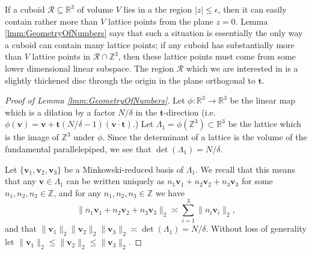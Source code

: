 \documentclass[10pt]{amsart}
\theoremstyle{plain}
\numberwithin{sblmm}{thrm}
\numberwithin{equation}{section}
\begin{document}
%
%
%
%
If a cuboid $\mathcal{R}\subseteq\mathbb{R}^3$ of volume $V$ lies in a the region $|z|\le \epsilon$, then it can easily contain rather more than $V$ lattice points from the plane $z=0$. Lemma \ref{lmm:GeometryOfNumbers} says that such a situation is essentially the only way a cuboid can contain many lattice points; if any cuboid has substantially more than $V$ lattice points in $\mathcal{R}\cap\mathbb{Z}^3$, then these lattice points must come from some lower dimensional linear subspace. The region $\mathcal{R}$ which we are interested in is a slightly thickened disc through the origin in the plane orthogonal to $\mathbf{t}$.
%
%
%
\begin{proof}[Proof of Lemma \ref{lmm:GeometryOfNumbers}]
%
Let $\phi:\mathbb{R}^3\rightarrow\mathbb{R}^3$ be the linear map which is a dilation by a factor $N/\delta$ in the $\mathbf{t}$-direction (i.e. $\phi(\mathbf{v})=\mathbf{v}+\mathbf{t}(N/\delta-1)(\mathbf{v}\cdot\mathbf{t})$.) Let $\Lambda_1=\phi(\mathbb{Z}^3)\subset\mathbb{R}^3$ be the lattice which is the image of $\mathbb{Z}^3$ under $\phi$. Since the determinant of a lattice is the volume of the fundamental parallelepiped, we see that $\det(\Lambda_1)=N/\delta$.

Let $\{\mathbf{v}_1,\mathbf{v}_2,\mathbf{v}_3\}$ be a Minkowski-reduced basis of $\Lambda_1$. We recall that this means that any $\mathbf{v}\in\Lambda_1$ can be written uniquely as $n_1\mathbf{v}_1+n_2\mathbf{v}_2+n_3\mathbf{v}_3$ for some $n_1,n_2,n_3\in\mathbb{Z}$, and for any $n_1,n_2,n_3\in\mathbb{Z}$ we have
\[
\|n_1\mathbf{v}_1+n_2\mathbf{v}_2+n_3\mathbf{v}_3\|_2\asymp \sum_{i=1}^3\|n_i\mathbf{v}_i\|_2,
\]
and that $\|\mathbf{v}_1\|_2\|\mathbf{v}_2\|_2\|\mathbf{v}_3\|_2\asymp \det(\Lambda_1)=N/\delta$. Without loss of generality let $\|\mathbf{v}_1\|_2\le \|\mathbf{v}_2\|_2\le\|\mathbf{v}_3\|_2$. 


\end{proof}
\end{document}
